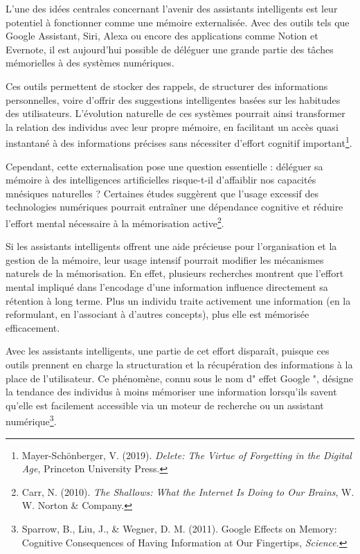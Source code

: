 \documentclass[11pt,a4paper]{report}
\begin{document}
L’une des idées centrales concernant l’avenir des assistants intelligents est leur potentiel à fonctionner comme une mémoire externalisée. Avec des outils tels que Google Assistant, Siri, Alexa ou encore des applications comme Notion et Evernote, il est aujourd’hui possible de déléguer une grande partie des tâches mémorielles à des systèmes numériques.

Ces outils permettent de stocker des rappels, de structurer des informations personnelles, voire d’offrir des suggestions intelligentes basées sur les habitudes des utilisateurs. L’évolution naturelle de ces systèmes pourrait ainsi transformer la relation des individus avec leur propre mémoire, en facilitant un accès quasi instantané à des informations précises sans nécessiter d’effort cognitif important\footnote{Mayer-Schönberger, V. (2019). \textit{Delete: The Virtue of Forgetting in the Digital Age}, Princeton University Press.}.

Cependant, cette externalisation pose une question essentielle : déléguer sa mémoire à des intelligences artificielles risque-t-il d’affaiblir nos capacités mnésiques naturelles ? Certaines études suggèrent que l’usage excessif des technologies numériques pourrait entraîner une dépendance cognitive et réduire l’effort mental nécessaire à la mémorisation active\footnote{Carr, N. (2010). \textit{The Shallows: What the Internet Is Doing to Our Brains}, W. W. Norton \& Company.}.

Si les assistants intelligents offrent une aide précieuse pour l’organisation et la gestion de la mémoire, leur usage intensif pourrait modifier les mécanismes naturels de la mémorisation. En effet, plusieurs recherches montrent que l’effort mental impliqué dans l’encodage d’une information influence directement sa rétention à long terme. Plus un individu traite activement une information (en la reformulant, en l’associant à d’autres concepts), plus elle est mémorisée efficacement.

Avec les assistants intelligents, une partie de cet effort disparaît, puisque ces outils prennent en charge la structuration et la récupération des informations à la place de l’utilisateur. Ce phénomène, connu sous le nom d" effet Google ", désigne la tendance des individus à moins mémoriser une information lorsqu’ils savent qu’elle est facilement accessible via un moteur de recherche ou un assistant numérique\footnote{Sparrow, B., Liu, J., \& Wegner, D. M. (2011). Google Effects on Memory: Cognitive Consequences of Having Information at Our Fingertips, \textit{Science}.}.
\end{document}
